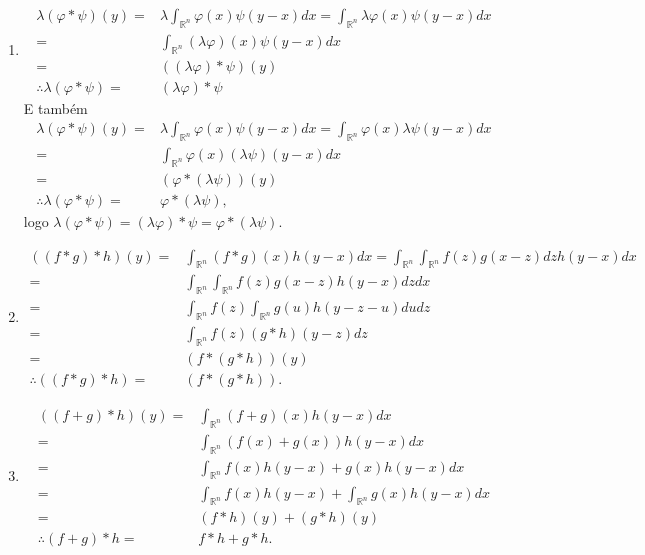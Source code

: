 \documentclass{article}
\begin{document}
\begin{enumerate}
\begin{enumerate}
\begin{enumerate}
						\item
						$$
						\begin{aligned}
						\lambda(\varphi*\psi)(y) = & \lambda \int_{\mathbb{R}^{n}}\varphi(x)\psi(y-x)dx = \int_{\mathbb{R}^{n}}\lambda\varphi(x)\psi(y-x)dx
						\\
						=& \int_{\mathbb{R}^{n}}(\lambda\varphi)(x)\psi(y-x)dx
						\\
						= & ((\lambda \varphi)*\psi)(y)
						\\
						\therefore \lambda( \varphi*\psi) = & (\lambda \varphi)*\psi
						\end{aligned}
						$$
						E também
						$$
						\begin{aligned}
						\lambda(\varphi*\psi)(y) = & \lambda \int_{\mathbb{R}^{n}}\varphi(x)\psi(y-x)dx = \int_{\mathbb{R}^{n}}\varphi(x)\lambda\psi(y-x)dx
						\\
						=& \int_{\mathbb{R}^{n}}\varphi(x)(\lambda\psi)(y-x)dx
						\\
						= & (\varphi*(\lambda\psi))(y)
						\\
						\therefore \lambda( \varphi*\psi) = & \varphi*(\lambda \psi),
						\end{aligned}
						$$
						logo $\lambda( \varphi*\psi)=(\lambda \varphi)*\psi=\varphi*(\lambda \psi)$.
						
						\item 
							$$
							\begin{aligned}
							((f*g)*h)(y) = & \int_{\mathbb{R}^{n}}(f*g)(x)h(y-x)dx =  \int_{\mathbb{R}^{n}}\int_{\mathbb{R}^{n}}f(z)g(x-z)dzh(y-x)dx
							\\
							= & \int_{\mathbb{R}^{n}}\int_{\mathbb{R}^{n}}f(z)g(x-z)h(y-x)dzdx
							\\
							= & \int_{\mathbb{R}^{n}}f(z)\int_{\mathbb{R}^{n}}g(u)h(y-z-u)dudz
							\\
							= & \int_{\mathbb{R}^{n}}f(z)(g*h)(y-z)dz
							\\
							= & 
							(f*(g*h))(y)
							\\
							\therefore ((f*g)*h) = & (f*(g*h)).
							\end{aligned}
							$$
							
							\item
							$$
							\begin{aligned}
							((f+g)*h)(y) = & \int_{\mathbb{R}^{n}}(f+g)(x)h(y-x)dx 
							\\
							= & \int_{\mathbb{R}^{n}}(f(x)+g(x))h(y-x)dx
							\\
							= & \int_{\mathbb{R}^{n}}f(x)h(y-x) + g(x)h(y-x)dx
							\\
							= & \int_{\mathbb{R}^{n}}f(x)h(y-x) + \int_{\mathbb{R}^{n}}g(x)h(y-x)dx
							\\
							= & (f*h)(y) + (g*h)(y)
							\\
							\therefore (f+g)*h = & f*h + g*h.
							\end{aligned}
							$$
							

\end{enumerate}
\end{enumerate}
\end{enumerate}
\end{document}
